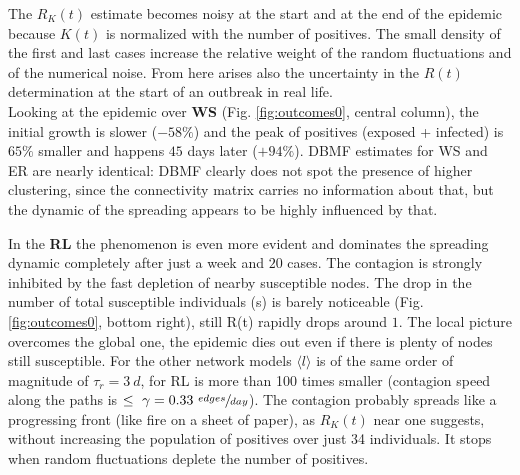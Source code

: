 \documentclass[DIV=12, BCOR=0pt]{scrartcl}  %
\begin{document}
  The $R_K(t)$ estimate becomes noisy at the start and at the end of the epidemic because $K(t)$ is normalized with the number of positives.
  The small density of the first and last cases increase the relative weight of the random fluctuations and of the numerical noise. From here arises also the uncertainty in the $R(t)$ determination at the start of an outbreak in real life.\\
  
  Looking at the epidemic over \textbf{WS} (Fig. \ref{fig:outcomes0}, central column), the initial growth is slower ($- 58 \%$) and the peak of positives (exposed + infected) is $65 \%$ smaller and happens $45$ days later ($+ 94 \%$). DBMF estimates for WS and ER are nearly identical: DBMF clearly does not spot the presence of higher clustering, since the connectivity matrix carries no information about that, but the dynamic of the spreading appears to be highly influenced by that.
  
  In the \textbf{RL} the phenomenon is even more evident and dominates the spreading dynamic completely after just a week and $20$ cases. The contagion is strongly inhibited by the fast depletion of nearby susceptible nodes. The drop in the number of total susceptible individuals (s) is barely noticeable (Fig. \ref{fig:outcomes0}, bottom right), still R(t) rapidly drops around $1$. The local picture overcomes the global one, the epidemic dies out even if there is plenty of nodes still susceptible. For the other network models $\langle l \rangle$ is of the same order of magnitude of $\tau_r = 3 \ d$, for RL is more than 100 times smaller (contagion speed along the paths is $\leq \ \gamma = 0.33 \ \sfrac{edges}{day}$).
  The contagion probably spreads like a progressing front (like fire on a sheet of paper), as $R_K(t)$ near one suggests, without increasing the population of positives over just 34 individuals. It stops when random fluctuations deplete the number of positives.\\
  
\end{document}
